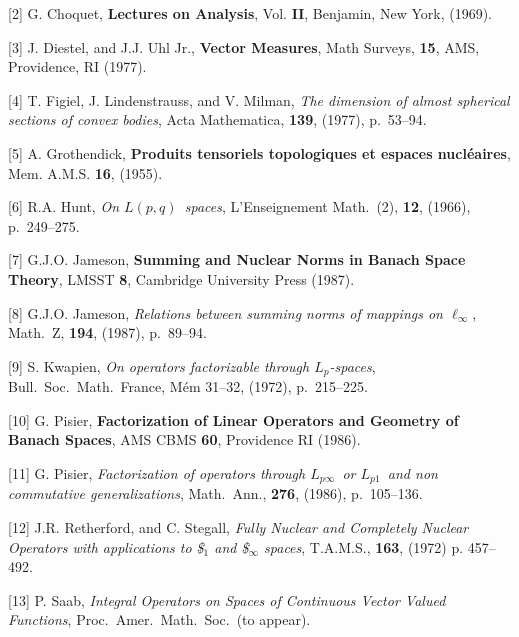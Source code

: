 \item {[2]} G. Choquet, {\bf Lectures on Analysis}, Vol. {\bf II},
Benjamin, New York, (1969).

\item {[3]} J. Diestel, and J.J. Uhl Jr., {\bf Vector Measures}, Math
Surveys, {\bf 15}, AMS, Providence, RI (1977).

\item{[4]} T. Figiel, J. Lindenstrauss, and V. Milman, {\it The 
dimension of
almost spherical sections of convex bodies}, Acta Mathematica, {\bf 
139},
(1977), p.~53--94.

\item {[5]} A. Grothendick, {\bf Produits tensoriels topologiques et
espaces nucl\'eaires}, Mem. A.M.S. {\bf 16}, (1955).

\item {[6]} R.A. Hunt, {\it On $L(p,q)$\ spaces}, L'Enseignement 
Math.\ (2),
{\bf 12}, (1966), p.~249--275.

\item {[7]} G.J.O. Jameson, {\bf Summing and Nuclear Norms in Banach
Space Theory}, LMSST {\bf 8}, Cambridge University Press (1987).

\item {[8]} G.J.O. Jameson, {\it Relations between summing norms of 
mappings on
$\ell_\infty$}, Math.~Z, {\bf 194}, (1987), p.~89--94.

\item {[9]} S. Kwapien, {\it On operators factorizable through 
$L_p$-spaces},
Bull.\ Soc.\ Math.\ France, M\'em 31--32, (1972), p.~215--225.

\item {[10]} G. Pisier, {\bf Factorization of Linear Operators and
Geometry of Banach Spaces}, AMS CBMS {\bf 60}, Providence RI (1986).

\item {[11]} G. Pisier, {\it Factorization of operators through 
$L_{p\infty}$\
or $L_{p1}$\ and non commutative generalizations}, Math.\ Ann., {\bf 
276},
(1986), p.~105--136.

\item {[12]} J.R. Retherford, and C. Stegall, {\it Fully Nuclear and
Completely Nuclear Operators with applications to {\it \$}$_1$ and 
{\it
\$}$_\infty$ spaces}, T.A.M.S., {\bf 163}, (1972) p. 457--492.

\item {[13]} P. Saab, {\it Integral Operators on Spaces of Continuous
Vector Valued Functions}, Proc.\ Amer.\ Math.\ Soc.\ (to appear).

